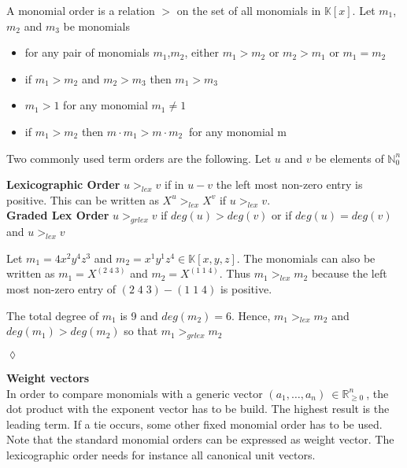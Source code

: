 \begin{env_definition} 
\cite{saleemi}
A monomial order is a relation $>$ on the set of all monomials in $\mathbb{K}\left[x\right]$.
Let $m_{1}$,$m_{2}$ and $m_{3}$ be monomials
\begin{center}

\begin{itemize}

\item
for any pair of monomials $m_{1}$,$m_{2}$, either $m_{1} > m_{2}$ or $m_{2} > m_{1}$ or $m_{1} = m_{2}$ 
\item
if $m_{1} > m_{2} $ and $m_{2} > m_{3}$ then $m_{1} > m_{3}$
\item
$m_{1} > 1$ for any monomial $m_{1} \neq 1$
\item
if $m_{1} > m_{2}$ then $m \cdot m_{1} > m \cdot m_{2}~$ for any monomial m

\end{itemize}
 
\end{center}

\end{env_definition}


Two commonly used term orders are the following.
Let $u$ and $v$ be elements of $\mathbb{N}^{n}_{0}$ 

\textbf{Lexicographic Order}\cite{saleemi}
$u >_{lex} v $ if in $u-v$ the left most non-zero entry is positive.
This can be written as $X^{u} >_{lex} X^{v}$ if $u >_{lex} v $.\\


\textbf{Graded Lex Order}\cite{saleemi}
$u >_{grlex} v $ if $ deg(u)>deg(v)$ or if $ deg(u)=deg(v)$ and $u >_{lex} v$

\begin{env_example} \normalfont
Let $m_{1} = 4x^{2}y^{4}z^{3}$ and $m_{2}= x^{1}y^{1}z^{4} \in \mathbb{K}\left[ x,y,z\right]  $.
The monomials can also be written as $m_{1} = X^{(2 \; 4 \; 3)}$ and $m_{2} = X^{(1 \; 1 \; 4)}$.
Thus $m_{1}>_{lex} m_{2}$ because the left most non-zero entry of $ (2 \; 4 \; 3) - (1 \; 1 \; 4)$ is positive.

The total degree of $m_{1}$ is 9 and $deg(m_{2})=6$. Hence, $m_{1}>_{lex} m_{2}$ and
$deg(m_{1})>deg(m_{2})$ so that $m_{1}>_{grlex} m_{2}$ 
\begin{flushright}
$\lozenge$
\end{flushright}
\end{env_example}
  

\textbf{Weight vectors} \\
In order to compare monomials with a generic vector $\left({a}_{1},\dots ,{a}_{n}\right)~\in \mathbb{R}^{n}_{\geq 0}~$, the dot product with the exponent vector has to be build. The highest result is the leading term. If a tie occurs, some other fixed monomial order has to be used. Note that the standard monomial orders can be expressed as weight vector. The lexicographic order needs for instance all canonical unit vectors.

